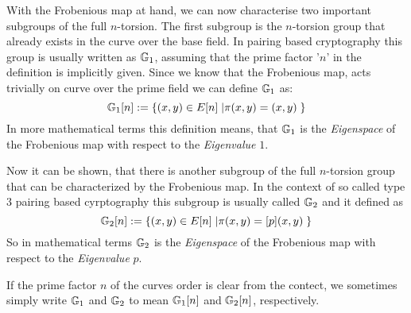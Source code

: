 With the Frobenious map at hand, we can now characterise two important subgroups of the full $n$-torsion. The first subgroup is the $n$-torsion group that already exists in the curve over the base field. In pairing based cryptography this group is usually written as $\mathbb{G}_1$, assuming that the prime factor '$n$' in the definition is implicitly given. Since we know that the Frobenious map, acts trivially on curve over the prime field we can define $\mathbb{G}_1$ as:
\begin{equation}
\mathbb{G}_1[n] := \{(x,y)\in E[n]\;| \pi(x,y) = (x,y)\;\}
\end{equation}
In more mathematical terms this definition means, that $\mathbb{G}_1$ is the \textit{Eigenspace} of the Frobenious map with respect to the \textit{Eigenvalue} $1$.

Now it can be shown, that there is another subgroup of the full $n$-torsion group that can be characterized by the Frobenious map. In the context of so called type $3$ pairing based cyrptography this subgroup is usually called $\mathbb{G}_2$ and it defined as
\begin{equation}
\mathbb{G}_2[n] := \{(x,y)\in E[n]\;| \pi(x,y) = [p](x,y)\;\}
\end{equation}
So in mathematical terms $\mathbb{G}_2$ is the \textit{Eigenspace} of the Frobenious map with respect to the \textit{Eigenvalue} $p$.
\begin{notation}
If the prime factor $n$ of the curves order is clear from the contect, we sometimes simply write $\mathbb{G}_1$ and $\mathbb{G}_2$ to mean $\mathbb{G}_1[n]$ and $\mathbb{G}_2[n]$, respectively.
\end{notation}

